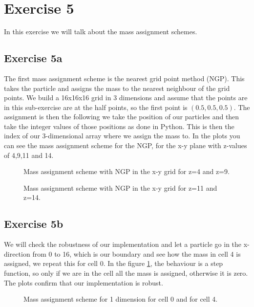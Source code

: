 \section{Exercise 5}
In this exercise we will talk about the mass assignment schemes.
\subsection{Exercise 5a}
The first mass assignment scheme is the nearest grid point method (NGP). This takes the particle and assigns the mass to the nearest neighbour of the grid points. We build a 16x16x16 grid in 3 dimensions and assume that the points are in this sub-exercise are at the half points, so the first point is $(0.5,0.5,0.5)$. The assignment is then the following we take the position of our particles and then take the integer values of those positions as done in Python. This is then the index of our 3-dimensional array where we assign the mass to. 
In the plots you can see the mass assignment scheme for the NGP, for the x-y plane with z-values of 4,9,11 and 14.
 \begin{figure}
    \centering
    \qquad
    \caption{Mass assignment scheme with NGP in the x-y grid for z=4 and z=9.}

  \end{figure}
 \begin{figure}
    \centering
    \qquad
    \caption{Mass assignment scheme with NGP in the x-y grid for z=11 and z=14.}
  \end{figure}

\subsection{Exercise 5b}
We will check the robustness of our implementation and let a particle go in the x-direction from 0 to 16, which is our boundary and see how the mass in cell 4 is assigned, we repeat this for cell 0. In the figure \ref{robust}, the behaviour is a step function, so only if we are in the cell all the mass is assigned, otherwise it is zero. The plots confirm that our implementation is robust.

 \begin{figure}
    \centering
    \qquad
    \caption{Mass assignment scheme for 1 dimension for cell 0 and for cell 4.}
    \label{robust}
  \end{figure}


